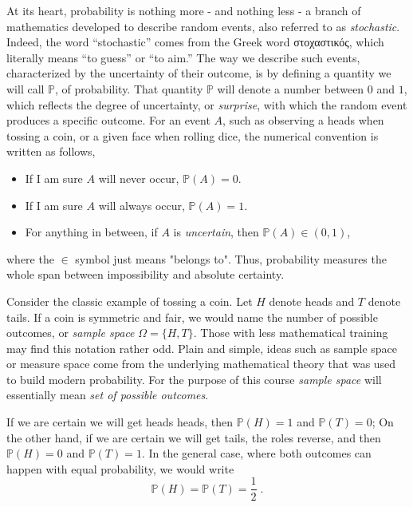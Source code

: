 \documentclass{book}
\begin{document}
At its heart, probability is nothing more - and nothing less - a branch of mathematics developed to describe random events, also referred to as \textit{stochastic}. Indeed, the word “stochastic” comes from the Greek word \textgreek{στοχαστικός}, which literally means “to guess” or “to aim.” The way we describe such events, characterized by the uncertainty of their outcome, is by defining a quantity we will call $\mathbb{P}$, of probability. That quantity $\mathbb{P}$ will denote a number between $0$ and $1$, which reflects the degree of uncertainty, or \textit{surprise}, with which the random event produces a specific outcome. For an event $A$, such as observing a heads when tossing a coin, or a given face when rolling dice, the numerical convention is written as follows,
\begin{itemize}
    \item If I am sure $A$ will never occur, $\mathbb{P}(A)=0$.
    \item If I am sure $A$ will always occur, $\mathbb{P}(A)=1$.
    \item For anything in between, if $A$ is \textit{uncertain}, then $\mathbb{P}(A) \in (0,1)$,
\end{itemize}
where the $\in$ symbol just means "belongs to". Thus, probability measures the whole span between impossibility and absolute certainty. 

\medskip

Consider the classic example of tossing a coin. Let $H$ denote heads and $T$ denote tails. If a coin is symmetric and fair, we would name the number of possible outcomes, or \textit{sample space} $\Omega = \{H,T\}$. Those with less mathematical training may find this notation rather odd. Plain and simple, ideas such as sample space or measure space come from the underlying mathematical theory that was used to build modern probability. For the purpose of this course \textit{sample space} will essentially mean \textit{set of possible outcomes}. 

If we are certain  we will get heads heads, then $\mathbb{P}(H)=1$ and $\mathbb{P}(T)=0$; On the other hand, if we are certain we will get tails, the roles reverse, and then $\mathbb{P}(H) = 0$ and $\mathbb{P}(T) = 1$. In the general case, where both outcomes can happen with equal probability, we would write
\begin{equation}
	\mathbb{P}(H) = \mathbb{P}(T) = \frac{1}{2} \; . \nonumber
	\label{eq:prob_coin}
\end{equation}
\end{document}
